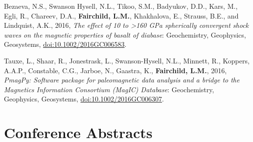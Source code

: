 \documentclass[10pt,a4paper,sans]{moderncv}
\begin{document}
\begin{etaremune}[itemsep=3pt]
    \item{Bezaeva, N.S., Swanson Hysell, N.L., Tikoo, S.M., Badyukov, D.D.,
            Kars, M., Egli, R., Chareev, D.A., \textbf{Fairchild, L.M.},
            Khakhalova, E., Strauss, B.E., and Lindquist, A.K., 2016,
            \textit{The effect of 10 to >160 GPa spherically convergent shock
            waves on the magnetic properties of basalt of diabase}:
            Geochemistry, Geophysics, Geosystems,
            {\color{cyan}\href{https://doi.org/10.1002/2016GC006583}
        {doi:10.1002/2016GC006583}}.}

    \item{Tauxe, L., Shaar, R., Jonestrask, L., Swanson-Hysell, N.L., Minnett,
            R., Koppers, A.A.P., Constable, C.G., Jarboe, N., Gaastra,  K.,
            \textbf{Fairchild, L.M.}, 2016, \textit{PmagPy: Software package for
                paleomagnetic data analysis and a bridge to the Magnetics
            Information Consortium (MagIC) Database}: Geochemistry,
            Geophysics, Geosystems,
            {\color{cyan}\href{https://doi.org/10.1002/2016GC006307}
        {doi:10.1002/2016GC006307}}.}

\end{etaremune}

\section{Conference Abstracts}
\end{document}
